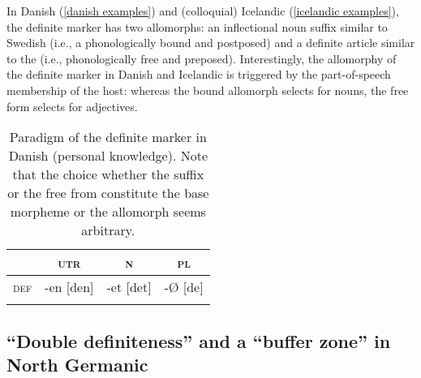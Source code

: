 {
In Danish (\ref{danish examples}) and (colloquial) Icelandic (\ref{icelandic examples}), the definite marker has two allomorphs: an inflectional noun suffix similar to Swedish (i.e., a phonologically bound and postposed) and a definite article similar to the  (i.e., phonologically free and preposed). Interestingly, the allomorphy of the definite marker in Danish and Icelandic is triggered by the part-of-speech membership of the host: whereas the bound allomorph selects for nouns, the free form selects for adjectives.
\begin{exe}
\label{danish examples}
\begin{xlist}
\end{xlist}
\end{exe}

\begin{table}[b]
\begin{tabular}{lccc}
\lsptoprule
			&\textsc{utr}	&\textsc{n}		&\textsc{pl}\\
\midrule
\textsc{def}	&-en [den]		&-et [det]			&-{Ø} [de]\\
\lspbottomrule
\end{tabular}
\caption[Paradigm of \textsc{def} in Danish]{Paradigm of the definite marker in Danish (personal knowledge). Note that the choice whether the suffix or the free from constitute the base morpheme or the allomorph seems arbitrary.}
\label{danish defallomorph}
\end{table}
\begin{exe}
\label{icelandic examples}
\begin{xlist}
\end{xlist}
\end{exe}

\subsection{“Double definiteness” and a “buffer zone” in North Germanic}
}
